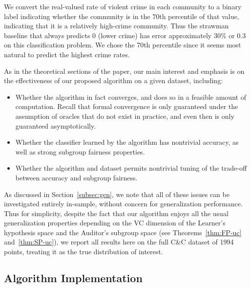 We convert the real-valued rate of violent crime in each community to a binary label
indicating whether the community is in the 70th percentile of that value, indicating that it is
a relatively high-crime community. Thus the strawman baseline that always predicts 0 (lower crime)
has error approximately 30\% or 0.3 on this classification problem. We chose the 70th percentile
since it seems most natural to predict the highest crime rates.

As in the theoretical sections of the paper, our main interest and emphasis is on the effectiveness
of our proposed algorithm \FFP on a given dataset, including:
\begin{itemize}
	\item Whether the algorithm in fact converges, and does so in a feasible amount of computation.
		Recall that formal convergence is only guaranteed under the assumption of oracles that
		do not exist in practice, and even then is only guaranteed asymptotically.
	\item Whether the classifier learned by the algorithm has nontrivial accuracy, as well as
		strong subgroup fairness properties.
	\item Whether the algorithm and dataset permits nontrivial tuning of the trade-off between accuracy and
		subgroup fairness.
\end{itemize}
As discussed in Section~\ref{subsec:gen},
we note that all of these issues can be investigated entirely in-sample, without concern for generalization
performance. Thus for simplicity, despite the fact that our algorithm enjoys all the usual generalization
properties depending on the VC dimension of the Learner's hypothesis space and the Auditor's
subgroup space (see Theorems~\ref{thm:FP-uc} and~\ref{thm:SP-uc}), we report all results here on the full C\&C dataset of 1994 points, treating
it as the true distribution of interest.

\subsection{Algorithm Implementation}

